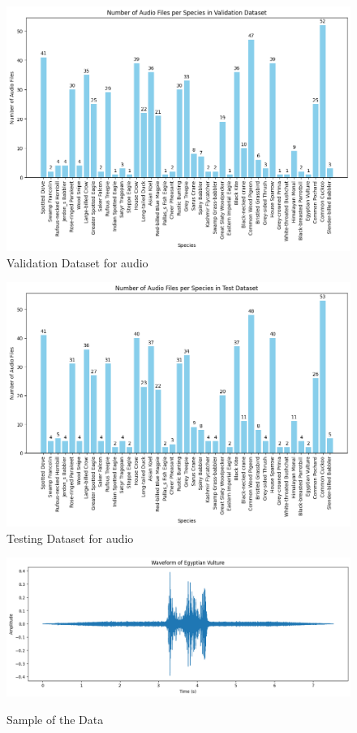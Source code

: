 \begin{figure}[h!]
    \centering
    \includegraphics[scale=0.4]{images/ValidationDataset.png}
    \caption{Validation Dataset for audio}
\end{figure}
\newpage
\begin{figure}[h!]
    \centering
    \includegraphics[scale=0.45]{images/TestDataset.png}
    \caption{Testing Dataset for audio}
\end{figure}
\hspace{3.5cm}
\begin{figure}[h!]
    \centering\label{SampleData}
    \includegraphics[scale=0.38]{images/SampleData.png}
    \caption{Sample of the Data}
\end{figure}
\newpage
